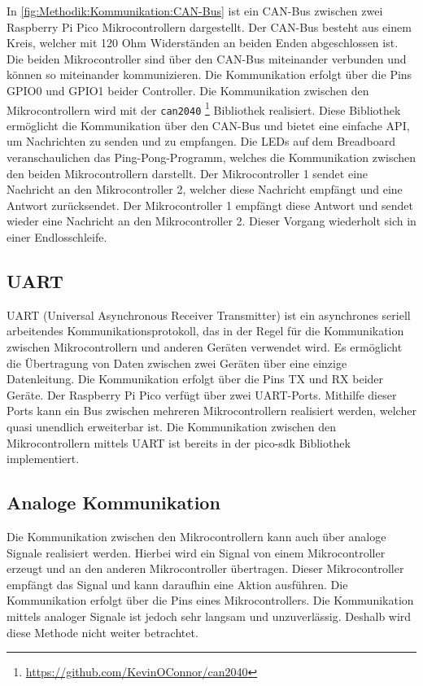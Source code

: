 In \autoref{fig:Methodik:Kommunikation:CAN-Bus} ist ein CAN-Bus zwischen zwei Raspberry Pi Pico Mikrocontrollern dargestellt. Der CAN-Bus besteht aus einem Kreis, welcher mit 120 Ohm Widerständen an beiden Enden abgeschlossen ist. Die beiden Mikrocontroller sind über den CAN-Bus miteinander verbunden und können so miteinander kommunizieren. Die Kommunikation erfolgt über die Pins GPIO0 und GPIO1 beider Controller. Die Kommunikation zwischen den Mikrocontrollern wird mit der \lstinline{can2040} \footnote{\url{https://github.com/KevinOConnor/can2040}} Bibliothek realisiert. Diese Bibliothek ermöglicht die Kommunikation über den CAN-Bus und bietet eine einfache API, um Nachrichten zu senden und zu empfangen. Die LEDs auf dem Breadboard veranschaulichen das Ping-Pong-Programm, welches die Kommunikation zwischen den beiden Mikrocontrollern darstellt. Der Mikrocontroller 1 sendet eine Nachricht an den Mikrocontroller 2, welcher diese Nachricht empfängt und eine Antwort zurücksendet. Der Mikrocontroller 1 empfängt diese Antwort und sendet wieder eine Nachricht an den Mikrocontroller 2. Dieser Vorgang wiederholt sich in einer Endlosschleife.

\subsection{UART}\label{text:Methodik:Kommunikation:UART}

UART (Universal Asynchronous Receiver Transmitter) ist ein asynchrones seriell arbeitendes Kommunikationsprotokoll, das in der Regel für die Kommunikation zwischen Mikrocontrollern und anderen Geräten verwendet wird. Es ermöglicht die Übertragung von Daten zwischen zwei Geräten über eine einzige Datenleitung. Die Kommunikation erfolgt über die Pins TX und RX beider Geräte.
\newline
Der Raspberry Pi Pico verfügt über zwei UART-Ports. Mithilfe dieser Ports kann ein Bus zwischen mehreren Mikrocontrollern realisiert werden, welcher quasi unendlich erweiterbar ist. Die Kommunikation zwischen den Mikrocontrollern mittels UART ist bereits in der pico-sdk Bibliothek implementiert.

\subsection{Analoge Kommunikation}\label{text:Methodik:Kommunikation:Analoge-Kommunikation}

Die Kommunikation zwischen den Mikrocontrollern kann auch über analoge Signale realisiert werden. Hierbei wird ein Signal von einem Mikrocontroller erzeugt und an den anderen Mikrocontroller übertragen. Dieser Mikrocontroller empfängt das Signal und kann daraufhin eine Aktion ausführen. Die Kommunikation erfolgt über die Pins eines Mikrocontrollers. Die Kommunikation mittels analoger Signale ist jedoch sehr langsam und unzuverlässig. Deshalb wird diese Methode nicht weiter betrachtet.

